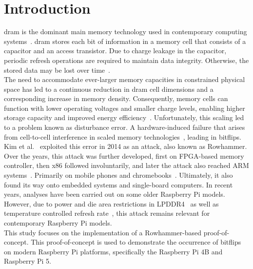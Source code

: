 \section{Introduction} \label{sec:introduction}
  \gls{dram} is the dominant main memory technology used in contemporary computing 
  systems~\cite{paperOnDRAM}. \gls{dram} stores each bit of information in a memory cell that 
  consists of a capacitor and an access transistor. Due to charge leakage in the 
  capacitor, periodic refresh operations are required to maintain data integrity. 
  Otherwise, the stored data may be lost over time~\cite{paperTriggeringRHHardwareFault}.
  \\
  The need to accommodate ever-larger memory capacities in constrained physical space 
  has led to a continuous reduction in \gls{dram} cell dimensions and a corresponding increase 
  in memory density. Consequently, memory cells can function with lower operating voltages 
  and smaller charge levels, enabling higher storage capacity and improved energy 
  efficiency~\cite{paperAnotherFlip}. Unfortunately, this scaling led to a problem known as disturbance 
  error. A hardware-induced failure that arises from cell-to-cell interference in scaled 
  memory technologies~\cite{paperRHARetrospective}, leading in bitflips.
  \\
  Kim et al.~\cite{paperFlippingBits} exploited this error in 2014 as an attack, also known as Rowhammer. 
  Over the years, this attack was further developed, first on FPGA-based memory 
  controller, then x86 followed involuntarily, and later the attack also reached ARM 
  systems~\cite{paperRowhammeronaRPi}. Primarily on mobile phones and 
  chromebooks~\cite{paperDrammer,paperTRRespass,paperBlacksmith,paperDRAMA}. Ultimately, 
  it also found its way onto embedded systems and single-board computers. In recent years, 
  analyses have been carried out on some older Raspberry Pi models. However, due to 
  power and die area restrictions in LPDDR4~\cite{paperBlacksmith} as well as temperature controlled 
  refresh rate~\cite{thesisDRAMA, datasheetLPDDR4, docJEDECLPDDR4, docJEDECLPDDR4x}, this attack 
  remains relevant for contemporary Raspberry Pi models.
  \\
  This study focuses on the implementation of a Rowhammer-based 
  proof-of-concept. This proof-of-concept is used to demonstrate the occurrence of bitflips on 
  modern Raspberry Pi platforms, specifically the Raspberry Pi 4B and Raspberry Pi 5.
  \\

